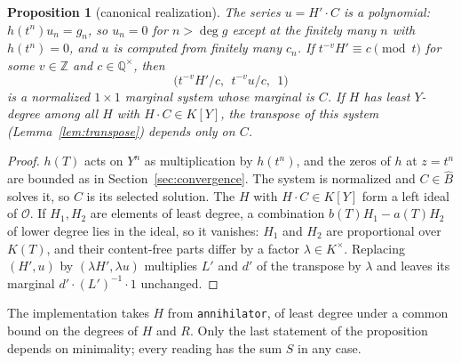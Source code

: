 \documentclass[11pt,a4paper]{article}
\newcommand{\Q}{\mathbb Q}
\newcommand{\Op}{\mathcal O}
\newcommand{\Bhat}{\widehat B}
\theoremstyle{plain}
\newtheorem{proposition}[theorem]{Proposition}
\theoremstyle{definition}
\theoremstyle{remark}
\begin{document}
\begin{proposition}[canonical realization]\label{prop:canonical-real}
The series $u=H'\cdot C$ is a polynomial: $h(t^n)u_n=g_n$, so $u_n=0$ for
$n>\deg g$ except at the finitely many $n$ with $h(t^n)=0$, and $u$ is computed
from finitely many $c_n$. If $t^{-v}H'\equiv c\pmod t$ for some $v\in\mathbb Z$
and $c\in\Q^\times$, then
\[
  \bigl(t^{-v}H'/c,\ \ t^{-v}u/c,\ \ 1\bigr)
\]
is a normalized $1\times1$ marginal system whose marginal is $C$. If $H$ has
least $Y$-degree among all $H$ with $H\cdot C\in K[Y]$, the transpose of this
system (Lemma~\ref{lem:transpose}) depends only on $C$.
\end{proposition}
\begin{proof}
$h(T)$ acts on $Y^n$ as multiplication by $h(t^n)$, and the zeros of $h$ at
$z=t^n$ are bounded as in Section~\ref{sec:convergence}. The system is
normalized and $C\in\Bhat$ solves it, so $C$ is its selected solution. The $H$
with $H\cdot C\in K[Y]$ form a left ideal of $\Op$. If $H_1,H_2$ are elements of
least degree, a combination $b(T)H_1-a(T)H_2$ of lower degree lies in the ideal,
so it vanishes: $H_1$ and $H_2$ are proportional over $K(T)$, and their
content-free parts differ by a factor $\lambda\in K^\times$. Replacing $(H',u)$
by $(\lambda H',\lambda u)$ multiplies $L'$ and $d'$ of the transpose by
$\lambda$ and leaves its marginal $d'\cdot(L')^{-1}\cdot1$ unchanged.
\end{proof}

The implementation takes $H$ from \texttt{annihilator}, of least degree under
a common bound on the degrees of $H$ and $R$. Only the last statement of the
proposition depends on minimality; every reading has the sum $S$ in any case.
\end{document}

